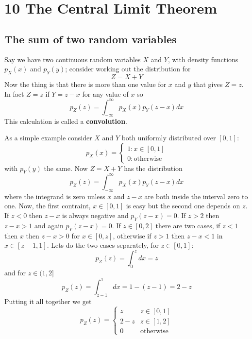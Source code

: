 \documentclass[11pt,a4paper]{scrartcl}
\begin{document}
\section*{10 The Central Limit Theorem}

\subsection*{The sum of two random variables}

Say we have two continuous random variables $X$ and $Y$, with density
functions $p_X(x)$ and $p_Y(y)$; consider working out the distribution for 
\begin{equation}
Z=X+Y
\end{equation}
Now the thing is that there is more than one value for $x$ and $y$
that gives $Z=z$. In fact $Z=z$ if $Y=z-x$ for any value of $x$ so
\begin{equation}
p_Z(z)=\int_{-\infty}^\infty {p_X(x)p_Y(z-x)dx}
\end{equation}
This calculation is called a \textbf{convolution}.

As a simple example consider $X$ and $Y$ both uniformly distributed
over $[0,1]$:
\begin{equation}
p_X(x)=\left\{\begin{array}{ll}1:x\in[0,1]\\0:\mbox{otherwise}\end{array}\right.
\end{equation}
with $p_Y(y)$ the same. Now $Z=X+Y$ has the distribution
\begin{equation}
p_Z(z)=\int_{-\infty}^\infty {p_X(x)p_Y(z-x)dx}
\end{equation}
where the integrand is zero unless $x$ and $z-x$ are both inside the
interval zero to one. Now, the first contraint, $x\in [0,1]$ is easy
but the second one depends on $z$. If $z<0$ then $z-x$ is always
negative and $p_Y(z-x)=0$. If $z>2$ then $z-x>1$ and again
$p_Y(z-x)=0$. If $z\in [0,2]$ there are two cases, if $z<1$ then $x$
then $z-x>0$ for $x\in [0,z]$, otherwise if $z>1$ then $z-x<1$ in $x\in
[z-1,1]$. Lets do the two cases separately, for $z\in [0,1]$:
\begin{equation}
p_Z(z)=\int_0^z dx=z
\end{equation}
and for $z\in (1,2]$
\begin{equation}
p_Z(z)=\int_{z-1}^1dx=1-(z-1)=2-z
\end{equation}
Putting it all together we get
\begin{equation}
p_Z(z)=\left\{\begin{array}{ll} z&z\in [0,1]\\2-z& z\in [1,2]\\0&\mbox{otherwise}\end{array}\right.
\end{equation}
\end{document}
